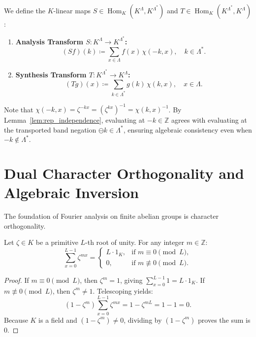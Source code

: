 \begin{definition}
We define the $K$-linear maps $S\in\operatorname{Hom}_K(K^\Lambda,K^{\Lambda^*})$ and $T\in\operatorname{Hom}_K(K^{\Lambda^*},K^\Lambda)$:
\begin{enumerate}
    \item \textbf{Analysis Transform $S : K^\Lambda \to K^{\Lambda^*}$:}
    \begin{equation}
    (S f)(k) \coloneqq \sum_{x \in \Lambda} f(x)\, \chi(-k, x), \quad k \in \Lambda^*.
    \end{equation}
    \item \textbf{Synthesis Transform $T : K^{\Lambda^*} \to K^\Lambda$:}
    \begin{equation}
    (T g)(x) \coloneqq \sum_{k \in \Lambda^*} g(k)\, \chi(k, x), \quad x \in \Lambda.
    \end{equation}
\end{enumerate}
\end{definition}

Note that $\chi(-k, x) = \zeta^{-k x} = (\zeta^{kx})^{-1} = \chi(k, x)^{-1}$. By Lemma~\ref{lem:rep_independence}, evaluating at $-k \in \mathbb{Z}$ agrees with evaluating at the transported band negation $\ominus k \in \Lambda^*$, ensuring algebraic consistency even when $-k \notin \Lambda^*$.

\section{Dual Character Orthogonality and Algebraic Inversion}

The foundation of Fourier analysis on finite abelian groups is character orthogonality.

\begin{lemma}
\label{lem:geom_sum}
Let $\zeta \in K$ be a primitive $L$-th root of unity. For any integer $m \in \mathbb{Z}$:
\begin{equation}
\sum_{x=0}^{L-1} \zeta^{m x} = \begin{cases}
L \cdot 1_K, & \text{if } m \equiv 0 \pmod L, \\
0, & \text{if } m \not\equiv 0 \pmod L.
\end{cases}
\end{equation}
\end{lemma}

\begin{proof}
If $m \equiv 0 \pmod L$, then $\zeta^m = 1$, giving $\sum_{x=0}^{L-1} 1 = L \cdot 1_K$.
If $m \not\equiv 0 \pmod L$, then $\zeta^m \neq 1$. Telescoping yields:
\begin{equation}
(1 - \zeta^m) \sum_{x=0}^{L-1} \zeta^{m x} = 1 - \zeta^{m L} = 1 - 1 = 0.
\end{equation}
Because $K$ is a field and $(1 - \zeta^m) \neq 0$, dividing by $(1 - \zeta^m)$ proves the sum is $0$.
\end{proof}


